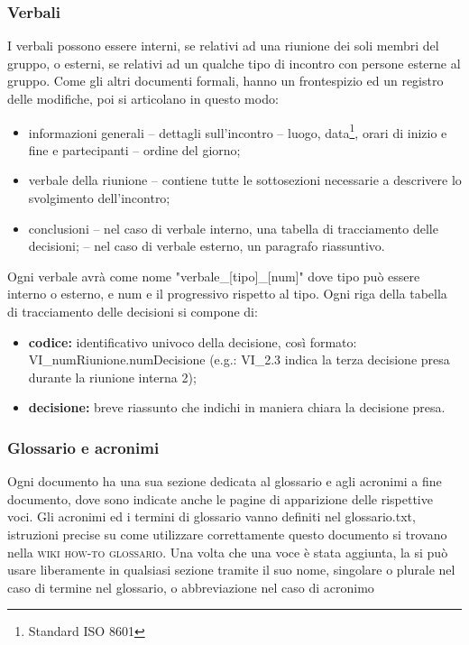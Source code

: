     \subsubsection{Verbali}
    \label{verbali}
    I verbali possono essere interni, se relativi ad una riunione dei soli membri del gruppo, o esterni, se relativi ad un qualche tipo di incontro con persone esterne al gruppo. Come gli altri documenti formali, hanno un frontespizio ed un registro delle modifiche, poi si articolano in questo modo:
    \begin{itemize}
        \item informazioni generali
        \subitem -- dettagli sull'incontro
        \subsubitem -- luogo, data\footnote{Standard ISO 8601}, orari di inizio e fine e partecipanti
        \subitem -- ordine del giorno;
        \item verbale della riunione
        \subitem -- contiene tutte le sottosezioni necessarie a descrivere lo svolgimento dell'incontro;
        \item conclusioni
        \subitem -- nel caso di verbale interno, una tabella di tracciamento delle decisioni;
        \subitem -- nel caso di verbale esterno, un paragrafo riassuntivo.
    \end{itemize}
    Ogni verbale avrà come nome "verbale\_[tipo]\_[num]" dove tipo può essere interno o esterno, e num e il progressivo rispetto al tipo.
    Ogni riga della tabella di tracciamento delle decisioni si compone di:
    \begin{itemize}
        \item \textbf{codice: }identificativo univoco della decisione, così formato: VI\_numRiunione.numDecisione (e.g.: VI\_2.3 indica la terza decisione presa durante la riunione interna 2);
        \item \textbf{decisione: }breve riassunto che indichi in maniera chiara la decisione presa.
    \end{itemize}
    \subsubsection{Glossario e acronimi}
    Ogni documento ha una sua sezione dedicata al glossario e agli acronimi a fine documento, dove sono indicate anche le pagine di apparizione delle rispettive voci.
    Gli acronimi ed i termini di glossario vanno definiti nel glossario.txt, istruzioni precise su come utilizzare correttamente questo documento si trovano nella \textsc{wiki how-to glossario}. Una volta che una voce è stata aggiunta, la si può usare liberamente in qualsiasi sezione tramite il suo nome, singolare o plurale nel caso di termine nel glossario, o abbreviazione nel caso di acronimo

